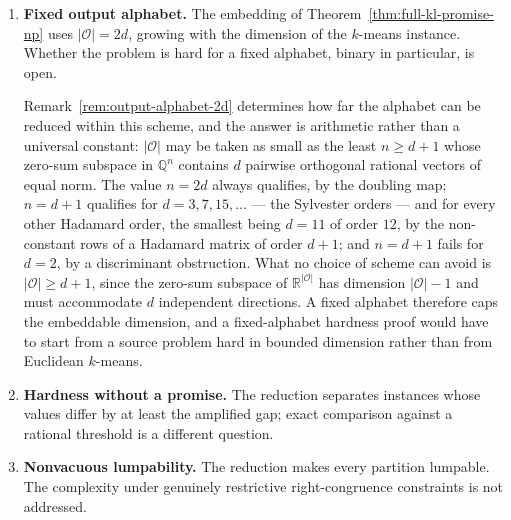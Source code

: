 \documentclass[12pt]{article}
\theoremstyle{definition}
\newcommand{\RetKL}{\Delta_{\mathrm{ret}}^{\mathrm{KL}}}
\begin{document}
\begin{enumerate}[leftmargin=2.0em]
\begin{enumerate}[label=(\alph*),leftmargin=2.0em]
Proposition~\ref{prop:full-kl-algebraic-form} locates the difficulty exactly.
For a fixed partition the whole sum collapses,
$\RetKL(\phi)=D^{-1}\log R$ with $D$ a positive integer and $R$ a positive
rational presented as a product of powers, so the comparison with $\tau$ is
equivalent to deciding $R\ge e^{D\tau}$.  The number of logarithmic terms is
therefore not the obstruction; the single rational-versus-exponential
comparison is.  That comparison is decidable, by
Lindemann--Weierstrass as recorded in
Remark~\ref{rem:full-kl-exp-membership}, and what is missing is a polynomial
bound on the precision needed to resolve it, equivalently a polynomial lower
bound on $|R-e^{D\tau}|$.  Remark~\ref{rem:full-kl-slp} shows that $R$ must be
kept in factored form for this to be a meaningful question, its expanded
numerator and denominator being of exponential bit size.  Consequently the
problem lies in NP as soon as this $\textup{\textsc{PosSLP}}$-type comparison admits
polynomial-time verifiable certificates.
\item \textbf{Fixed output alphabet.}  The embedding of
Theorem~\ref{thm:full-kl-promise-np} uses $|\mathcal O|=2d$, growing with the
dimension of the $k$-means instance.  Whether the problem is hard for a fixed
alphabet, binary in particular, is open.

Remark~\ref{rem:output-alphabet-2d} determines how far the alphabet can be
reduced within this scheme, and the answer is arithmetic rather than a
universal constant: $|\mathcal O|$ may be taken as small as the least
$n\ge d+1$ whose zero-sum subspace in $\mathbb Q^{n}$ contains $d$ pairwise
orthogonal rational vectors of equal norm.  The value $n=2d$ always qualifies,
by the doubling map; $n=d+1$ qualifies for $d=3,7,15,\dots$ --- the Sylvester
orders --- and for every other Hadamard order, the smallest being $d=11$ of
order $12$, by the non-constant rows of a Hadamard matrix of order $d+1$; and
$n=d+1$ fails for $d=2$, by a discriminant obstruction.  What no choice of scheme can avoid is
$|\mathcal O|\ge d+1$, since the zero-sum subspace of
$\mathbb R^{|\mathcal O|}$ has dimension $|\mathcal O|-1$ and must accommodate
$d$ independent directions.  A fixed alphabet therefore caps the embeddable
dimension, and a fixed-alphabet hardness proof would have to start from a
source problem hard in bounded dimension rather than from Euclidean
$k$-means.
\item \textbf{Hardness without a promise.}  The reduction separates instances
whose values differ by at least the amplified gap; exact comparison against a
rational threshold is a different question.
\item \textbf{Nonvacuous lumpability.}  The reduction makes every partition
lumpable.  The complexity under genuinely restrictive right-congruence
constraints is not addressed.
\end{enumerate}


\end{enumerate}
\end{document}
